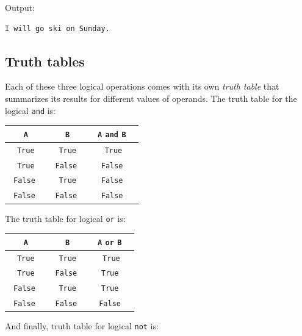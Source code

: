 \noindent
Output:\\

\begin{ybox}
\begin{Verbatim}[commandchars=\\\{\}]
I will go ski on Sunday.
\end{Verbatim}
\end{ybox}

\subsection[\ \ Truth tables]{Truth tables}

Each of these three logical operations comes with its own {\em truth table} that 
summarizes its results for different values of operands. The truth table for the 
logical {\tt and} is:\\

\begin{center}
\begin{tabular}{|c|c||c|}
\hline
{\tt A} & {\tt B} & \ {\tt A} {\tt and} {\tt B} \ \\
\hline
\hline
{\tt True} & {\tt True} & {\tt True} \\
\hline
{\tt True} & \ {\tt False} \ & \ {\tt False} \ \\
\hline
\ {\tt False} \ & {\tt True} & \ {\tt False} \ \\
\hline
\ {\tt False} \ & \ {\tt False} \ & \ {\tt False} \ \\
\hline
\end{tabular}
\end{center}
\vspace{4mm}
\noindent
The truth table for logical {\tt or} is:\\

\begin{center}
\begin{tabular}{|c|c||c|}
\hline
{\tt A} & {\tt B} & \ {\tt A} {\tt or} {\tt B} \ \\
\hline
\hline
{\tt True} & {\tt True} & {\tt True} \\
\hline
{\tt True} & \ {\tt False} \ & \ {\tt True} \ \\
\hline
\ {\tt False} \ & {\tt True} & \ {\tt True} \ \\
\hline
\ {\tt False} \ & \ {\tt False} \ & \ {\tt False} \ \\
\hline
\end{tabular}
\end{center}
\vspace{4mm}
\noindent
And finally, truth table for logical {\tt not} is:\\

